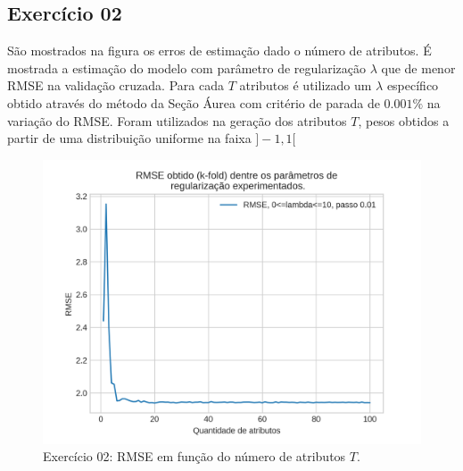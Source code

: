 \documentclass{article}
\begin{document}
    \newpage
    \subsection[]{Exercício 02}
    São mostrados na figura  os erros de estimação dado o número de atributos.
    É mostrada a estimação do modelo com parâmetro de regularização $\lambda$ que de menor RMSE na validação cruzada.
    Para cada $T$ atributos é utilizado um $\lambda$ específico obtido através do
    método da Seção Áurea com critério de parada de $0.001\%$ na variação do RMSE.
    Foram utilizados na geração dos atributos $T$,
    pesos obtidos a partir de uma distribuição uniforme na faixa $]-1,1[$
    \begin{figure}[H]
        \centering
        \includegraphics[width=\linewidth]{ex02/TsMeans.png}
        \caption{Exercício 02: RMSE em função do número de atributos $T$.}
        \label{fig:ex2_TRMSE}
    \end{figure}
    
\end{document}

